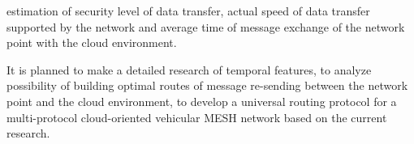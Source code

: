 \documentclass[a4paper,twoside]{article}
\begin{document}
estimation of security level of data transfer, actual speed of data transfer supported by the network and average time of message exchange of the network point with the cloud environment.

It is planned to make a detailed research of temporal features, to analyze possibility of building optimal routes of message re-sending between the network point and the cloud environment, to develop a universal routing protocol for a multi-protocol cloud-oriented vehicular MESH network based on the current research.

{}
\end{document}
